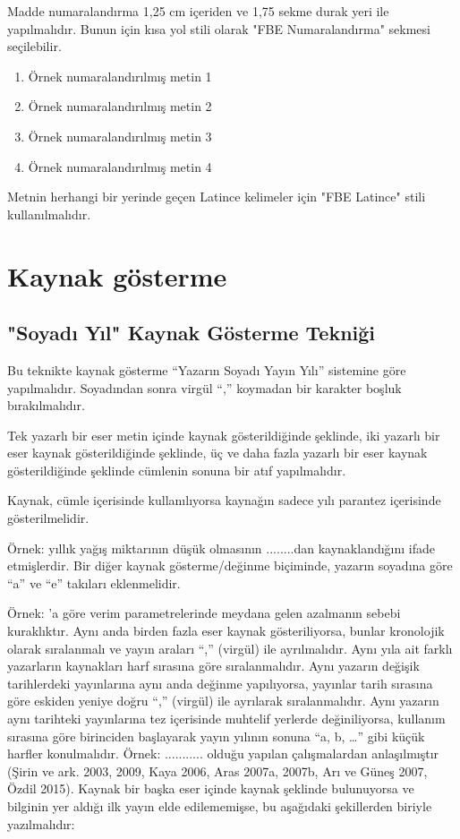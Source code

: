 Madde numaralandırma 1,25 cm içeriden ve 1,75 sekme durak yeri ile yapılmalıdır. Bunun için kısa yol stili olarak "FBE Numaralandırma" sekmesi seçilebilir.
\begin{enumerate}
	\setlength{\itemindent}{1.25cm}
	\item Örnek numaralandırılmış metin 1
	\item Örnek numaralandırılmış metin 2
	\item Örnek numaralandırılmış metin 3
	\item Örnek numaralandırılmış metin 4
\end{enumerate}

Metnin herhangi bir yerinde geçen Latince kelimeler için "FBE Latince" stili kullanılmalıdır.


\section{Kaynak gösterme}

\subsection{"Soyadı Yıl" Kaynak Gösterme Tekniği}

Bu teknikte kaynak gösterme “Yazarın Soyadı Yayın Yılı” sistemine göre yapılmalıdır. Soyadından sonra virgül “,” koymadan bir karakter boşluk bırakılmalıdır.

Tek yazarlı bir eser metin içinde kaynak gösterildiğinde \parencite{Olekseyuk2002} şeklinde, iki yazarlı bir eser kaynak gösterildiğinde \parencite{Yoo2010} şeklinde, üç ve daha fazla yazarlı bir eser kaynak gösterildiğinde \parencite{Sakamoto2005} şeklinde cümlenin sonuna bir atıf yapılmalıdır.

Kaynak, cümle içerisinde kullanılıyorsa kaynağın sadece yılı parantez içerisinde gösterilmelidir.

Örnek: \citet{Sakamoto2005} yıllık yağış miktarının düşük olmasının ........dan kaynaklandığını ifade etmişlerdir.
Bir diğer kaynak gösterme/değinme biçiminde, yazarın soyadına göre “a” ve “e” takıları eklenmelidir.

Örnek: \citet{Olekseyuk2002}’a göre verim parametrelerinde meydana gelen azalmanın sebebi kuraklıktır.
Aynı anda birden fazla eser kaynak gösteriliyorsa, bunlar kronolojik olarak sıralanmalı ve yayın araları “,” (virgül) ile ayrılmalıdır. Aynı yıla ait farklı yazarların kaynakları harf sırasına göre sıralanmalıdır. Aynı yazarın değişik tarihlerdeki yayınlarına aynı anda değinme yapılıyorsa, yayınlar tarih sırasına göre eskiden yeniye doğru “,” (virgül) ile ayrılarak sıralanmalıdır. Aynı yazarın aynı tarihteki yayınlarına tez içerisinde muhtelif yerlerde değiniliyorsa, kullanım sırasına göre birinciden başlayarak yayın yılının sonuna “a, b, …” gibi küçük harfler konulmalıdır. Örnek: ........... olduğu yapılan çalışmalardan anlaşılmıştır (Şirin ve ark. 2003, 2009, Kaya 2006, Aras 2007a, 2007b, Arı ve Güneş 2007, Özdil 2015).
Kaynak bir başka eser içinde kaynak şeklinde bulunuyorsa ve bilginin yer aldığı ilk yayın elde edilememişse, bu aşağıdaki şekillerden biriyle yazılmalıdır:

